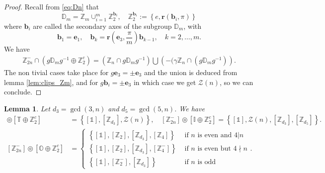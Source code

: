 \documentclass[11pt,a4paper]{amsart}
\newtheorem{lem}[thm]{Lemma}
\theoremstyle{definition}
\newcommand{\ZZ}{\mathbb{Z}}                %
\newcommand{\octa}{\mathbb{O}}              %
\newcommand{\ico}{\mathbb{I}}               %
\newcommand{\tetra}{\mathbb{T}}             %
\newcommand{\DD}{\mathbb{D}}                %
\newcommand{\1}{\mathds{1}}		            %
\newcommand{\ee}{\pmb{e}}                   %
\newcommand{\vR}{\mathbf{r}}
\newcommand{\bb}{\mathbf{b}}
\newcommand{\set}[1]{\left\{#1\right\}}     %
\begin{document}
\begin{proof}
  Recall from \eqref{eq:Dn} that
  \begin{equation*}
    \DD_m=\ZZ_m \cup_{i=1}^{m} \ZZ_2^{\bb_i},\quad \ZZ_{2}^{\bb_i}:=\set{e,\vR(\bb_i,\pi)}
  \end{equation*}
  where $\bb_i$ are called the secondary axes of the subgroup $\DD_m$, with
  \begin{equation*}
    \bb_1=\ee_1,\quad \bb_k=\vR\left(\ee_3,\frac{\pi}{m}\right)\bb_{k-1},\quad k=2,\dotsc,m.
  \end{equation*}
  We have
  \begin{align*}
    \ZZ_{2n}^- \cap (g\DD_m g^{-1}\oplus \ZZ_2^c)=\left(\ZZ_n\cap g\DD_m g^{-1} \right) \bigcup \left(-(\gamma\ZZ_n \cap(g\DD_m g^{-1})\right).
   \end{align*}
  The non tivial cases take place for $g\ee_3=\pm\ee_3$ and the union is deduced from lemma \ref{lem:clips_Zm}, and for $g\bb_i=\pm\ee_3$ in which case we get $\mathcal{Z}(n)$, so we can conclude.
\end{proof}

\begin{lem}\label{lem:Z2nmClipsExceptionels}
Let $d_3=\gcd(3,n)$ and $d_5=\gcd(5,n)$.
	  We have
	  \begin{align*}
		   [\ZZ_{2n}^-]\circledcirc [\tetra\oplus\ZZ_2^c] & =
		   \set{[\1],[\ZZ_{d_3}],\mathcal{Z}(n)},\quad [\ZZ_{2n}^-]\circledcirc[\ico\oplus \ZZ_2^c]=\set{[\1],\mathcal{Z}(n),[\ZZ_{d_3}],[\ZZ_{d_5}]}. \\
		    [\ZZ_{2n}^-]\circledcirc[\octa\oplus \ZZ_2^c]  & =
		    \begin{cases}
		      \set{[\1],[\ZZ_2],[\ZZ_{d_3}],[\ZZ_4]}   & \text{ if $n$ is even and $4|n$}      \\
		     \set{[\1],[\ZZ_2],[\ZZ_{d_3}],[\ZZ_4^-]} & \text{ if $n$ is even but $4\nmid n$} \\
		     \set{[\1],[\ZZ_2^-],[\ZZ_{d_3}]}         & \text{ if $n$ is odd}
		   \end{cases}.
		 \end{align*}
		\end{lem}
		
\end{document}
